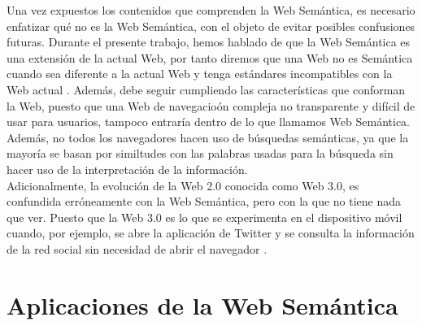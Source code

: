 Una vez expuestos los contenidos que comprenden la Web Semántica, es necesario enfatizar qué no es la Web Semántica, con el objeto de evitar posibles confusiones futuras. Durante el presente trabajo, hemos hablado de que la Web Semántica es una extensión de la actual Web, por tanto diremos que una Web no es Semántica cuando sea diferente a la actual Web y tenga estándares incompatibles con la Web actual \cite{introduccion}. Además, debe seguir cumpliendo las características que conforman la Web, puesto que una Web de navegacioón compleja no transparente y difícil de usar para usuarios, tampoco entraría dentro de lo que llamamos Web Semántica. Además, no todos los navegadores hacen uso de búsquedas semánticas, ya que la mayoría se basan por similtudes con las palabras usadas para la búsqueda sin hacer uso de la interpretación de la información.\\

Adicionalmente, la evolución de la Web 2.0 conocida como Web 3.0, es confundida erróneamente con la Web Semántica, pero con la que no tiene nada que ver. Puesto que la Web 3.0 es lo que se experimenta en el dispositivo móvil cuando, por ejemplo, se abre la aplicación de Twitter y se consulta la información de la red social sin necesidad de abrir el navegador \cite{web-nueva}.

\section{Aplicaciones de la Web Semántica}


